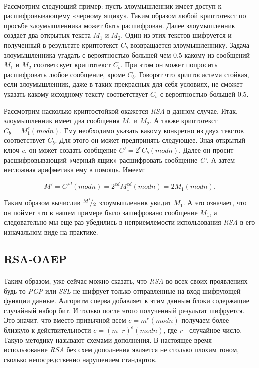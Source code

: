 \paragraph{} Рассмотрим следующий пример: пусть злоумышленник имеет доступ к расшифровывающему «черному ящику». Таким образом любой криптотекст по просьбе 
  злоумышленника может быть расшифрован. Далее злоумышленник создает два открытых текста {$M_1$} и {$M_2$}. 
  Один из этих текстов шифруется и полученный в результате криптотекст {$C_b$} возвращается злоумышленнику. Задача злоумышленника 
  угадать с вероятностью большей чем 0.5 какому из сообщений {$M_1$} и {$M_2$} соответсвует криптотекст 
  {$C_b$}. При этом он может попросить расшифровать любое сообщение, кроме {$C_b$}. Говорят что криптосистема 
  стойкая, если злоумышленник, даже в таких прекрасных для себя условиях, не сможет указать какому исходному тексту соответствует {$C_b$}
  с вероятностью большей 0.5.

  Рассмотрим насколько криптостойкой окажется \textit{RSA} в данном случае. Итак, злоумышленник имеет два сообщения {$M_1$} и 
  {$M_2$}. А также криптотекст {$C_{b}=M^{e}_{1}(mod n)$}. Ему необходимо указать какому 
  конкретно из двух текстов соответствует {$C_b$}. Для этого он может предпринять следующее. Зная открытый ключ \textit{e}, он может 
  создать сообщение {$C'=2^{e} C_{b}(mod n)$}. Далее он просит расшифровывающий «черный ящик» расшифровать сообщение 
  \textit{C'}. А затем несложная арифметика ему в помощь. Имеем:

    \begin{equation}
      \textit{{$M'=C'^d(mod n)=2^{e d}M_{1}^{e d}(mod n)=2M_{1}(mod n).$}} 
    \end{equation}

  Таким образом вычислив {${}^{M'}\!/_{2}$} злоумышленник увидит {$M_1$}. А это означает, что он поймет что в нашем примере было зашифровано 
  сообщение {$M_1$}, а следовательно мы еще раз убедились в неприемлемости использования \textit{RSA} в его изначальном виде на практике.

\subsection{RSA-OAEP}

\paragraph{} Таким образом, уже сейчас можно сказать, что \textit{RSA} во всех своих проявлениях будь то \textit{PGP} или \textit{SSL} не шифрует только 
  отправленные на вход шифрующей функции данные. Алгоритм сперва добавляет к этим данным блоки содержащие случайный набор бит. И только после этого полученный
  результат шифруется. Это значит, что вместо привычной всем {$c=m^{e}(mod n)$} получаем более близкую к действительности 
  {$c=(m||r)^{e}(mod n)$}, где \textit{r} - случайное число. Такую методику называют схемами дополнения. В настоящее время использование
  \textit{RSA} без схем дополнения является не столько плохим тоном, сколько непосредственно нарушением стандартов.


